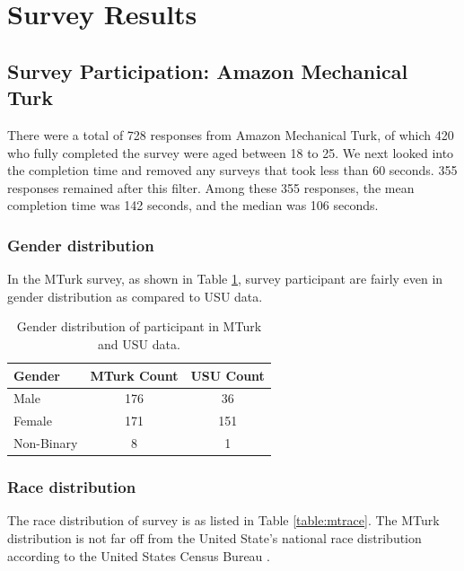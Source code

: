 \documentclass[conference]{IEEEtran}
\begin{document}




\section{Survey Results}
\subsection{Survey Participation: Amazon Mechanical Turk}\label{subsec3}


There were a total of 728 responses from Amazon Mechanical Turk, of which 420 who
fully completed the survey were aged between 18 to 25. We next looked into the completion
time and removed any surveys that took less than 60 seconds. 355 responses remained after this
filter. Among these 355 responses, the mean completion time was 142 seconds, and the median
was 106 seconds.

\subsubsection{Gender distribution}\label{subsubsec3}
In the MTurk survey, as shown in Table \ref{table:mtgender}, survey participant are fairly even in gender distribution as compared to USU data.

\begin{table}
\centering
\begin{tabular}{|l|c|c|}
\hline
Gender     & MTurk Count & USU Count \\
\hline

Male       & 176 & 36  \\
Female     & 171 & 151  \\
Non-Binary & 8  & 1   \\
\hline

\end{tabular}
\vspace{4pt}
\caption{Gender distribution of participant in MTurk and USU data.}
\label{table:mtgender}
\end{table}

\subsubsection{Race distribution}\label{subsubsec3}

The race distribution of survey is as listed in Table \ref{table:mtrace}.
The MTurk distribution is not far off from the United State's national race distribution according to the United States Census Bureau \cite{uscensus}. 
\end{document}
